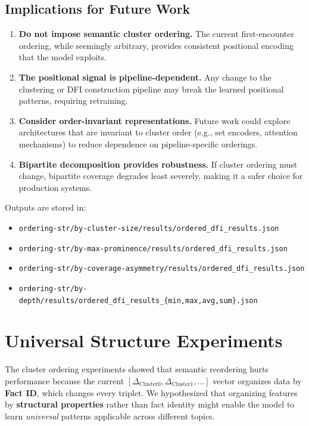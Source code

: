 \documentclass[12pt,a4paper]{article}
\begin{document}
\subsection{Implications for Future Work}

\begin{enumerate}
\item \textbf{Do not impose semantic cluster ordering.} The current first-encounter ordering,
      while seemingly arbitrary, provides consistent positional encoding that the model exploits.

\item \textbf{The positional signal is pipeline-dependent.} Any change to the clustering or
      DFI construction pipeline may break the learned positional patterns, requiring retraining.

\item \textbf{Consider order-invariant representations.} Future work could explore architectures
      that are invariant to cluster order (e.g., set encoders, attention mechanisms) to reduce
      dependence on pipeline-specific orderings.

\item \textbf{Bipartite decomposition provides robustness.} If cluster ordering must change,
      bipartite coverage degrades least severely, making it a safer choice for production systems.
\end{enumerate}

Outputs are stored in:
\begin{itemize}
\item \texttt{ordering-str/by-cluster-size/results/ordered\_dfi\_results.json}
\item \texttt{ordering-str/by-max-prominence/results/ordered\_dfi\_results.json}
\item \texttt{ordering-str/by-coverage-asymmetry/results/ordered\_dfi\_results.json}
\item \texttt{ordering-str/by-depth/results/ordered\_dfi\_results\_\{min,max,avg,sum\}.json}
\end{itemize}

\section{Universal Structure Experiments}

The cluster ordering experiments showed that semantic reordering hurts performance because
the current $[\Delta_{\text{Cluster0}}, \Delta_{\text{Cluster1}}, \ldots]$ vector organizes
data by \textbf{Fact ID}, which changes every triplet. We hypothesized that organizing features
by \textbf{structural properties} rather than fact identity might enable the model to learn
\textit{universal} patterns applicable across different topics.
\end{document}
